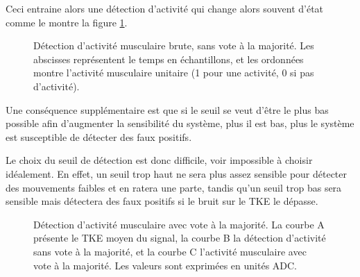 \documentclass[letterpaper, twoside, 12pt, memoire, creativecommons, hyperref]{thETS}
\begin{document}
Ceci entraine alors une détection d'activité qui change alors souvent d'état comme le montre la figure \ref{fig:onsetSansVote}.

\begin{figure}
	\centering
	\caption{Détection d'activité musculaire brute, sans vote à la majorité. Les abscisses représentent le temps en échantillons, et les ordonnées montre l'activité musculaire unitaire (1 pour une activité, 0 si pas d'activité).}
	\label{fig:onsetSansVote}
\end{figure}

Une conséquence supplémentaire est que si le seuil se veut d'être le plus bas possible afin d'augmenter la sensibilité du système, plus il est bas, plus le système est susceptible de détecter des faux positifs. 

Le choix du seuil de détection est donc difficile, voir impossible à choisir idéalement. En effet, un seuil trop haut ne sera plus assez sensible pour détecter des mouvements faibles et en ratera une parte, tandis qu'un seuil trop bas sera sensible mais détectera des faux positifs si le bruit sur le TKE le dépasse.

\begin{figure}
	\centering
	\caption{Détection d'activité musculaire avec vote à la majorité. La courbe A présente le TKE moyen du signal, la courbe B la détection d'activité sans vote à la majorité, et la courbe C l'activité musculaire avec vote à la majorité. Les valeurs sont exprimées en unités ADC.}
	\label{fig:onsetAvecVote}
\end{figure}
\end{document}
